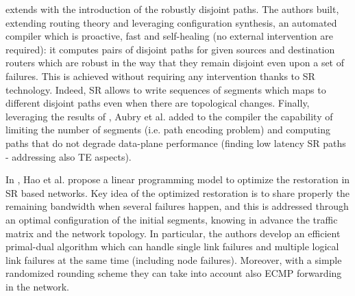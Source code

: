\cite{aubry2018robustly} extends \cite{trafficduplication} with the introduction of the robustly disjoint paths. The authors built, extending routing theory and leveraging configuration synthesis, an automated compiler which is proactive, fast and self-healing (no external intervention are required): it computes pairs of disjoint paths for given sources and destination routers which are robust in the way that they remain disjoint even upon a set of failures. This is achieved without requiring any intervention thanks to SR technology. Indeed, SR allows to write sequences of segments which maps to different disjoint paths even when there are topological changes. Finally, leveraging the results of \cite{trafficduplication}, Aubry et al. added to the compiler the capability of limiting the number of segments (i.e. path encoding problem) and computing paths that do not degrade data-plane performance (finding low latency SR paths - addressing also TE aspects). %

In \cite{optimizingrestoration}, Hao et al. propose a linear programming model to optimize the restoration in SR based networks. Key idea of the optimized restoration is to share properly the remaining bandwidth when several failures happen, and this is addressed through an optimal configuration of the initial segments, knowing in advance the traffic matrix and the network topology. In particular, the authors develop an efficient primal-dual algorithm which can handle single link failures and multiple logical link failures at the same time (including node failures). Moreover, with a simple randomized rounding scheme they can take into account also ECMP forwarding in the network. 

